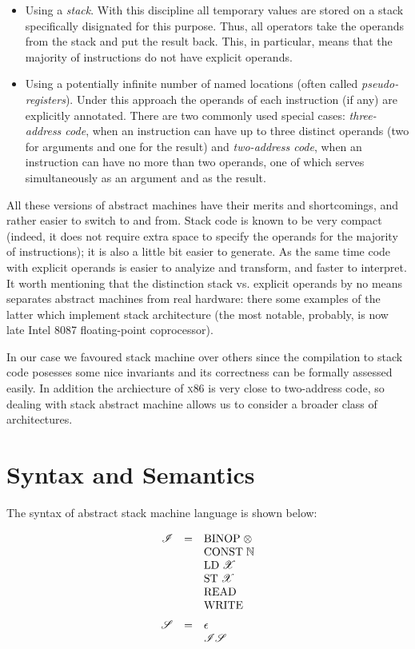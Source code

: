 \begin{itemize}
\item Using a \emph{stack}. With this discipline all temporary values are stored on a stack specifically disignated
  for this purpose. Thus, all operators take the operands from the stack and put the result back. This, in particular,
  means that the majority of instructions do not have explicit operands.
  
\item Using a potentially infinite number of named locations (often called \emph{pseudo-registers}). Under this approach
  the operands of each instruction (if any) are explicitly annotated. There are two commonly used special cases: \emph{three-address code},
  when an instruction can have up to three distinct operands (two for arguments and one for the result) and
  \emph{two-address code}, when an instruction can have no more than two operands, one of which serves simultaneously
  as an argument and as the result.
\end{itemize}

All these versions of abstract machines have their merits and shortcomings, and rather easier to switch to and from. Stack code is known
to be very compact (indeed, it does not require extra space to specify the operands for the majority of instructions); it is also a
little bit easier to generate. As the same time code with explicit operands is easier to analyize and transform, and faster to
interpret. It worth mentioning that the distinction stack vs. explicit operands by no means separates abstract machines from
real hardware: there some examples of the latter which implement stack architecture (the most notable, probably, is now late
Intel 8087 floating-point coprocessor).

In our case we favoured stack machine over others since the compilation to stack code posesses some nice invariants and
its correctness can be formally assessed easily. In addition the archiecture of \textsc{x86} is very close to two-address
code, so dealing with stack abstract machine allows us to consider a broader class of architectures.

\section{Syntax and Semantics}

The syntax of abstract stack machine language is shown below:

\[
\begin{array}{rcl}
  \mathscr{I} & = & \llang{BINOP$\;\otimes$}\\
              &   & \llang{CONST $\;\mathbb{N}$}\\
              &   & \llang{LD$\;\mathscr{X}$}\\
              &   & \llang{ST$\;\mathscr{X}$}\\
              &   & \llang{READ}\\
              &   & \llang{WRITE}\\[2mm]
  \mathscr{S} & = & \epsilon\\
              &   & \mathscr{I}\mathscr{S}
\end{array}
\]

